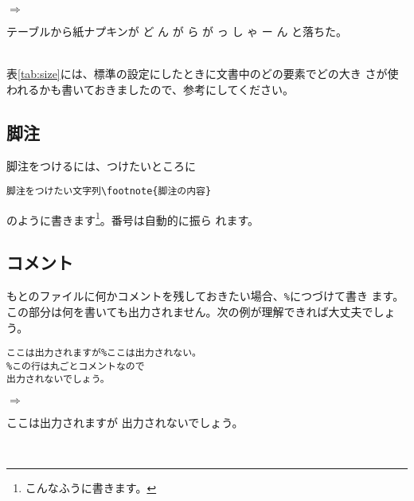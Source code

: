 $\Rightarrow$
\begin{minipage}{.45\textwidth}
\begin{shadebox}
テーブルから紙ナプキンが
{\tiny ど}
{\scriptsize ん}
{\footnotesize が}
{\small ら}
{\normalsize が}
{\large っ}
{\Large し}
{\LARGE ゃ}
{\huge ー}
{\Huge ん}
と落ちた。
\end{shadebox}
\end{minipage}
\vspace*{1mm}\\
表\ref{tab:size}には、標準の設定にしたときに文書中のどの要素でどの大き
さが使われるかも書いておきましたので、参考にしてください。

\subsection{脚注}
脚注をつけるには、つけたいところに
\begin{screen}
\begin{verbatim}
脚注をつけたい文字列\footnote{脚注の内容}
\end{verbatim}
\end{screen}
のように書きます\footnote{こんなふうに書きます。}。番号は自動的に振ら
れます。

\subsection{コメント}
もとのファイルに何かコメントを残しておきたい場合、\verb+%+につづけて書き
ます。この部分は何を書いても出力されません。次の例が理解できれば大丈夫でしょう。\\
\begin{minipage}[c]{.50\textwidth}
\begin{screen}
\small
\begin{verbatim}
ここは出力されますが%ここは出力されない。
%この行は丸ごとコメントなので
出力されないでしょう。
\end{verbatim}
\end{screen}
\end{minipage}%
$\Rightarrow$
\begin{minipage}{.45\textwidth}
\begin{shadebox}
ここは出力されますが%
出力されないでしょう。
\end{shadebox}
\end{minipage}
\vspace*{1mm}\\

